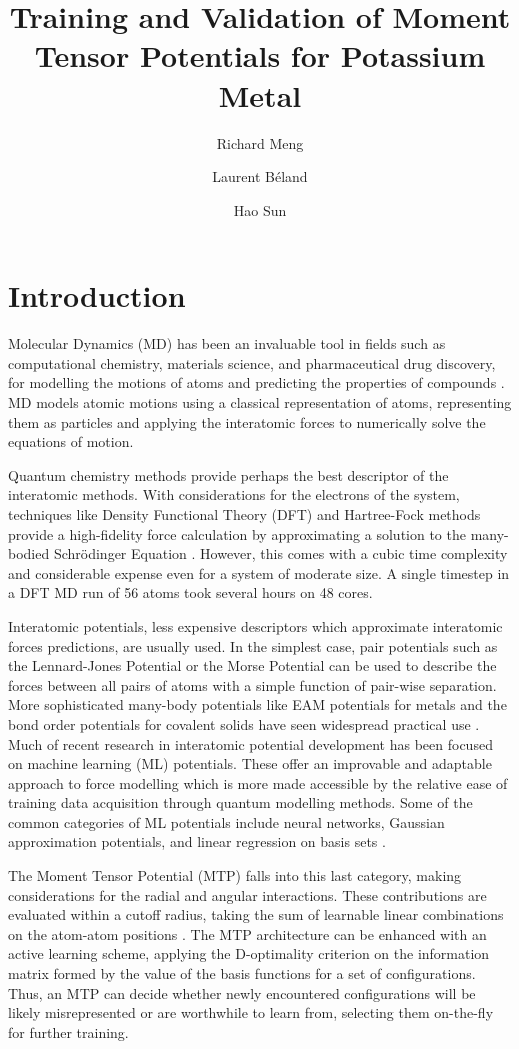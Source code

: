 \documentclass[9pt,twocolumn,twoside]{opticajnl}
\title{Training and Validation of Moment Tensor Potentials for Potassium Metal}
\author[1,2,3]{ Richard Meng}
\author[1]{Laurent  Béland}
\author[1]{Hao Sun}
\affil[1]{Department of Mechanical and Materials Engineering, Queen's University, 45 Union St, Kingston, ON K7L 3N6}
\affil[2]{contact@richardzjm.com}
\affil[3]{17zjm1@queensu.ca}
\begin{document}
\maketitle

\section{Introduction}
Molecular Dynamics (MD) has been an invaluable tool in fields such as computational chemistry, materials science, and pharmaceutical drug discovery, for modelling the motions of atoms and predicting the properties of compounds \cite{karplus2002molecular}. MD models atomic motions using a classical representation of atoms, representing them as particles and applying the interatomic forces to numerically solve the equations of motion.

Quantum chemistry methods provide perhaps the best descriptor of the interatomic methods. With considerations for the electrons of the system, techniques like Density Functional Theory (DFT) and Hartree-Fock methods provide a high-fidelity force calculation by approximating a solution to the many-bodied Schrödinger Equation \cite{DFT}. However, this comes with a cubic time complexity and considerable expense even for a  system of moderate size.  A single timestep in a DFT MD run of 56 atoms took several hours on 48 cores. 

Interatomic potentials, less expensive descriptors which approximate interatomic forces predictions, are usually used. In the simplest case, pair potentials such as the Lennard-Jones Potential or the Morse Potential can be used to describe the forces between all pairs of atoms with a simple function of pair-wise separation. More sophisticated many-body potentials like EAM potentials for metals and the bond order potentials for covalent solids have seen widespread practical use \cite{MatSci}. Much of recent research in interatomic potential development has been focused on machine learning (ML) potentials. These offer an improvable and adaptable approach to force modelling which is more made accessible by the relative ease of training data acquisition through quantum modelling methods. Some of the common categories of ML potentials include neural networks, Gaussian approximation potentials, and linear regression on basis sets \cite{mlip}.

The Moment Tensor Potential (MTP) falls into this last category, making considerations for the radial and angular interactions. These contributions are evaluated within a cutoff radius, taking the sum of learnable linear combinations on the atom-atom positions \cite{mtp}. The MTP architecture can be enhanced with an active learning scheme, applying the D-optimality criterion on the information matrix formed by the value of the basis functions for a set of configurations. Thus, an MTP can decide whether newly encountered configurations will be likely misrepresented or are worthwhile to learn from, selecting them on-the-fly for further training.
\end{document}
